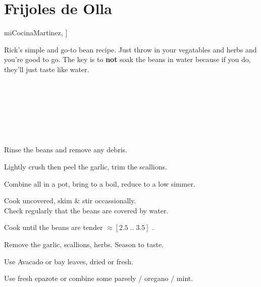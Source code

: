\section{Frijoles de Olla}\label{frijoles_de_olla}

\begin{recipestats}[
        servings=12 $C$,
        preptime=15 \minute,
        bakingtime=3 \hour,
        original=\citeauthor{miCocinaMartinez}~\cite[p.54]{miCocinaMartinez},
    ]
\end{recipestats}

\begin{recipeabstract}
    Rick's simple and go-to bean recipe.
    Just throw in your vegatables and herbs and you're good to go.
    The key is to \textbf{not} soak the beans in water because if you do, they'll just taste like water.
\end{recipeabstract}

\begin{ingredientcolumns}
    \begin{ingredientblock}
        \\
        \\
        \\
    \end{ingredientblock}

    \begin{ingredientblock}
        \\
        \\
    \end{ingredientblock}
\end{ingredientcolumns}

\begin{preparation}
\item Rinse the beans and remove any debris.
\item Lightly crush then peel the garlic, trim the scallions.
\item Combine all in a pot, bring to a boil, reduce to a low simmer.
\item Cook uncovered, skim \& stir occassionally.\\
    Check regularly that the beans are covered by water.
\item Cook until the beans are tender $\approx[2.5\;..\; 3.5]$ \hour.
\item Remove the garlic, scallions, herbs. Season to taste.
\end{preparation}

\begin{variation}
\item Use Avacado or bay leaves, dried or fresh.
\item Use fresh epazote or combine some parsely / oregano / mint.
\end{variation}

\recipeend%
